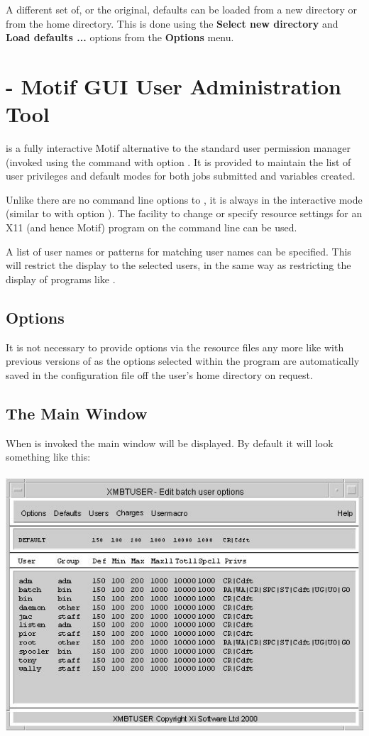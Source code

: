 A different set of, or the original, defaults can be loaded from a new directory or from the home directory. This is done using the
\textbf{Select new directory} and \textbf{Load defaults ...} options from the \textbf{Options} menu.

\section{\XmbtuserName{} - Motif GUI User Administration Tool}
\PrXmbtuser{} is a fully interactive Motif alternative to the standard user permission manager (invoked using the command
\PrBtuser{} with option .
It is provided to maintain the list of user privileges and default modes for both jobs submitted
and variables created.

Unlike \PrBtuser{} there are no command line options to \PrXmbtuser{}, it is always in the interactive
mode (similar to \PrBtuser{} with option ). The facility to change or specify resource settings for an X11 (and hence Motif)
program on the command line can be used.

A list of user names or patterns for matching user names can be specified. This will restrict the display to the selected users, in the
same way as restricting the display of programs like \PrBtq{}.

\subsection{Options}
It is not necessary to provide options via the resource files any more like with previous versions
of \PrXmbtuser{} as the options selected within the program are automatically saved in the configuration
file \homeconfigpath{} off the user's home directory on request.
\subsection{The Main Window}
When \PrXmbtuser{} is invoked the main window will be displayed. By default it will look something like this:

 \includegraphics[width=13.667cm,height=9.737cm]{img/ref46.jpg} 

